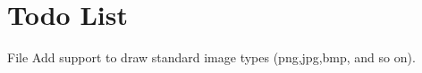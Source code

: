 \chapter{Todo List}
\hypertarget{todo}{}\label{todo}

\begin{DoxyRefList}
\item[File \doxylink{video_8c}{video.c} ]\label{todo__todo000001}%
%
Add support to draw standard image types (png,jpg,bmp, and so on). 
\end{DoxyRefList}